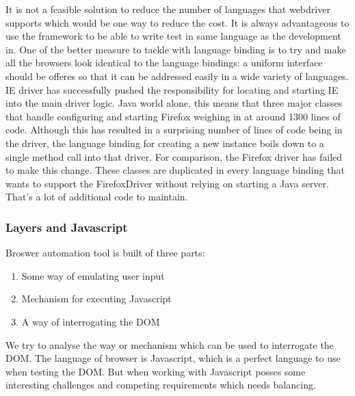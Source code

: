 \documentclass[article,type=msc,colorback,accentcolor=tud9c,twoside,11pt]{tudthesis}
\begin{document}
It is not a feasible solution to reduce the number of languages that webdriver supports which would be one way to reduce the cost. It is always advantageous to use the framework to be able to write test in same language as the development in. One of the better measure to tackle with language binding is to try and make all the browsers look identical to the language bindings: a uniform interface should be offeres so that it can be addressed easily in a wide variety of languages. IE driver has successfully pushed the responsibility for locating and starting IE into the main driver logic. Java world alone, this means that three major classes that handle configuring and starting Firefox weighing in at around 1300 lines of code. Although this has resulted in a surprising number of lines of code being in the driver, the language binding for creating a new instance boils down to a single method call into that driver. For comparison, the Firefox driver has failed to make this change. These classes are duplicated in every language binding that wants to support the FirefoxDriver without relying on starting a Java server. That's a lot of additional code to maintain.

\subsubsection{Layers and Javascript}
Broswer automation tool is built of three parts:
\begin{enumerate}
	\item Some way of emulating user input
	\item Mechanism for executing Javascript
	\item A way of interrogating the DOM
\end{enumerate}
We try to analyse the way or mechanism which can be used to interrogate the DOM. The language of browser is Javascript, which is a perfect language to use when testing the DOM. But when working with Javascript posses some interesting challenges and competing requirements which needs balancing.
\end{document}
